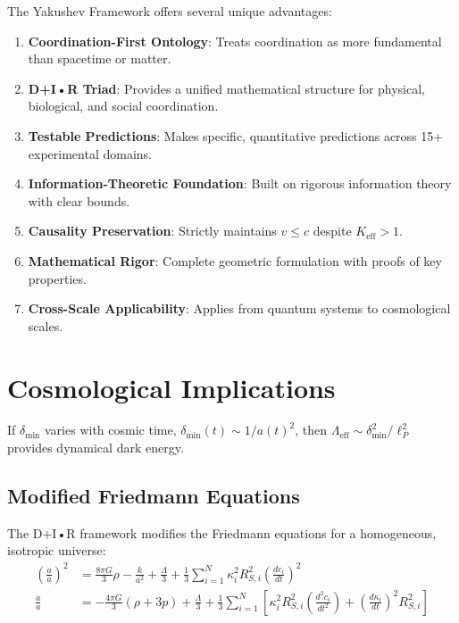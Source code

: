 \documentclass[11pt,a4paper]{article}
\begin{document}
	The Yakushev Framework offers several unique advantages:
	
	\begin{enumerate}
		\item \textbf{Coordination-First Ontology}: Treats coordination as more fundamental than spacetime or matter.
		
		\item \textbf{D+I•R Triad}: Provides a unified mathematical structure for physical, biological, and social coordination.
		
		\item \textbf{Testable Predictions}: Makes specific, quantitative predictions across 15+ experimental domains.
		
		\item \textbf{Information-Theoretic Foundation}: Built on rigorous information theory with clear bounds.
		
		\item \textbf{Causality Preservation}: Strictly maintains $v \leq c$ despite $K_{\mathrm{eff}} > 1$.
		
		\item \textbf{Mathematical Rigor}: Complete geometric formulation with proofs of key properties.
		
		\item \textbf{Cross-Scale Applicability}: Applies from quantum systems to cosmological scales.
	\end{enumerate}
	
	\section{Cosmological Implications}
	If $\delta_{\min}$ varies with cosmic time, $\delta_{\min}(t) \sim 1/a(t)^2$, then $\Lambda_{\text{eff}} \sim \delta_{\min}^2/\ell_P^2$ provides dynamical dark energy.
	\subsection{Modified Friedmann Equations}
	
	The D+I•R framework modifies the Friedmann equations for a homogeneous, isotropic universe:
	\begin{align}
		\left(\frac{\dot{a}}{a}\right)^2 &= \frac{8\pi G}{3}\rho - \frac{k}{a^2} + \frac{\Lambda}{3} + \frac{1}{3}\sum_{i=1}^N \kappa_i^2 R_{S,i}^2 \left(\frac{dc_i}{dt}\right)^2 \\
		\frac{\ddot{a}}{a} &= -\frac{4\pi G}{3}(\rho + 3p) + \frac{\Lambda}{3} + \frac{1}{3}\sum_{i=1}^N \left[ \kappa_i^2 R_{S,i}^2 \left(\frac{d^2c_i}{dt^2}\right) + \left(\frac{d\kappa_i}{dt}\right)^2 R_{S,i}^2 \right]
	\end{align}
	
\end{document}
